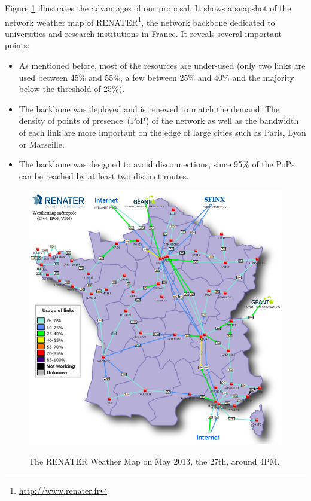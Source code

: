 Figure \ref{fig:renater} illustrates the advantages of our proposal. It
 shows a snapshot of the network weather
map of RENATER\footnote{\href{http://www.renater.fr}{http://www.renater.fr}}, the network backbone dedicated to universities and research
institutions in France. It reveals several important points: 
\begin{itemize} 
\item As mentioned before, most of the resources are under-used (only two links are used between 45\% and 55\%, a few between 25\% and 40\% and the majority below the threshold of 25\%). 
\item The backbone was deployed and is renewed to match the demand: The density of
points of presence~(PoP) of the network as well as the bandwidth of each link are more important on the edge of large cities such as Paris, Lyon or
Marseille. 
\item The backbone was designed to avoid disconnections, since 95\% of the PoPs can be reached by at least two distinct routes.
\end{itemize}


\begin{figure}[b]
\includegraphics[width=12cm]{./FIGS/renater.png}
\vspace*{-.3cm}
\label{fig:renater}
\caption{The RENATER Weather Map on May 2013, the 27th, around 4PM.}
\vspace*{-.3cm}
\end{figure}

